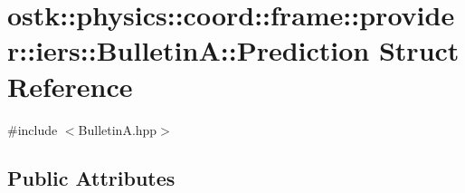 \hypertarget{structostk_1_1physics_1_1coord_1_1frame_1_1provider_1_1iers_1_1_bulletin_a_1_1_prediction}{}\section{ostk\+:\+:physics\+:\+:coord\+:\+:frame\+:\+:provider\+:\+:iers\+:\+:BulletinA\+:\+:Prediction Struct Reference}
\label{structostk_1_1physics_1_1coord_1_1frame_1_1provider_1_1iers_1_1_bulletin_a_1_1_prediction}


{\ttfamily \#include $<$Bulletin\+A.\+hpp$>$}

\subsection*{Public Attributes}
